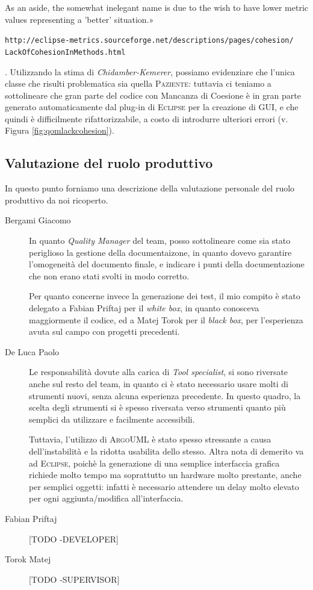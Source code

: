 \begin{description}
{	As an aside, the somewhat inelegant name is due to the wish to have lower
	 metric values representing a 'better' situation.» 
	 
	 \texttt{http://eclipse-metrics.sourceforge.net/descriptions/pages/cohesion/\\
	 LackOfCohesionInMethods.html}}.
	Utilizzando la stima di \textit{Chidamber-Kemerer}, possiamo evidenziare
	che l'unica classe che risulti problematica sia quella \textsc{Paziente}:
	tuttavia ci teniamo a sottolineare che gran parte del codice con Mancanza
	di Coesione è in gran parte generato automaticamente dal plug-in di 
	\textsc{Eclipse} per la creazione di GUI, e che quindi è difficilmente
	rifattorizzabile, a costo di introdurre ulteriori errori (v. Figura 
	\vref{fig:qomlackcohesion}).
\end{description}


\subsection{Valutazione del ruolo produttivo}
In questo punto forniamo una descrizione della valutazione personale del ruolo
produttivo da noi ricoperto.
\begin{description}
\item[Bergami Giacomo] In quanto \textit{Quality Manager} del team, posso sottolineare
	come sia stato periglioso la gestione della documentaizone, in quanto
	dovevo garantire l'omogeneità del documento finale, e indicare i punti
	della documentazione che non erano stati svolti in modo corretto.
	
	Per quanto concerne invece la generazione dei test, il mio compito è
	stato delegato a Fabian Priftaj per il \textit{white box}, in quanto conosceva
	maggiormente il codice, ed a Matej Torok per il \textit{black box}, per
	l'esperienza avuta sul campo con progetti precedenti.
\item[De Luca Paolo] Le responsabilità dovute alla carica di \textit{Tool specialist}, si
	sono riversate anche sul resto del team, in quanto ci è stato necessario
	usare molti di strumenti nuovi, senza alcuna esperienza 
	precedente. In questo quadro, la scelta degli strumenti si è spesso 
	riversata verso strumenti quanto più semplici da utilizzare e facilmente
	accessibili.

	Tuttavia, l'utilizzo di \textsc{ArgoUML} è stato spesso stressante a causa 
	dell'instabilità e la ridotta usabilita dello stesso. Altra nota di 
	demerito va ad \textsc{Eclipse}, poichè la generazione di una semplice 
	interfaccia grafica richiede molto tempo ma soprattutto un hardware 
	molto prestante, anche per semplici oggetti: infatti è necessario attendere
	un delay molto elevato per ogni aggiunta/modifica all'interfaccia.
\item[Fabian Priftaj] [TODO -DEVELOPER]
\item[Torok Matej] [TODO -SUPERVISOR]
\end{description}

